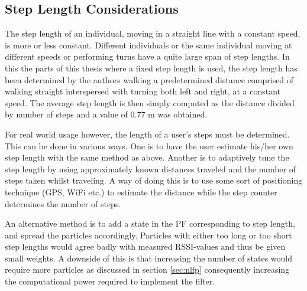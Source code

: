 \documentclass{LTHthesis}
\begin{document}
\subsection{Step Length Considerations}
\label{subsec:step_len}
%
The step length of an individual, moving in a straight line with a constant speed, is more or less constant. Different individuals or the same individual moving at different speeds or performing turns have a quite large span of step lengths. In this the parts of this thesis where a fixed step length is used, the step length has been determined by the authors walking a predetermined distance comprised of walking straight interspersed with turning both left and right, at a constant speed. The average step length is then simply computed as the distance divided by number of steps and a value of $0.77$ m was obtained.  

For real world usage however, the length of a user's steps must be determined. This can be done in various ways. One is to have the user estimate his/her own step length with the same method as above. Another is to adaptively tune the step length by using approximately known distances traveled and the number of steps taken whilst traveling. A way of doing this is to use some sort of positioning technique (GPS, WiFi etc.) to estimate the distance while the step counter determines the number of steps.

An alternative method is to add a state in the PF corresponding to step length, and spread the particles accordingly. Particles with either too long or too short step lengths would agree badly with measured RSSI-values and thus be given small weights. A downside of this is that increasing the number of states would require more particles as discussed in section \ref{sec:nlfp} consequently increasing the computational power required to implement the filter.      
%
\end{document}
